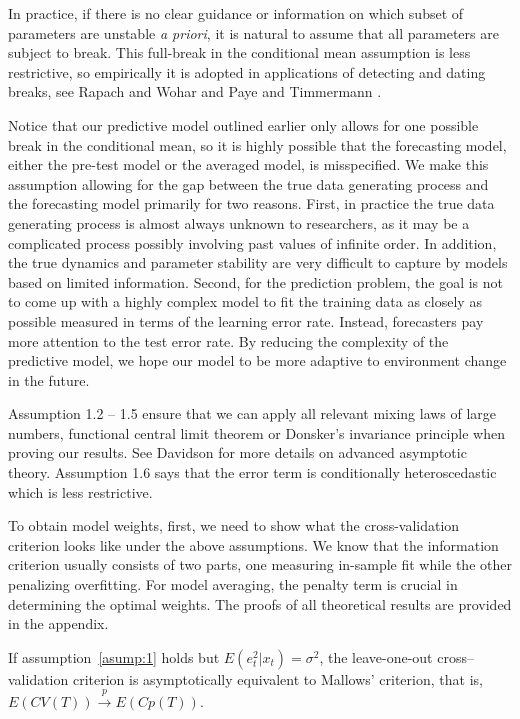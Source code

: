 In practice, if there is no clear guidance or information on which subset of parameters are unstable \emph{a priori}, it is natural to assume that all parameters are subject to break. This full-break in the conditional mean assumption is less restrictive, so empirically it is adopted in applications of detecting and dating breaks, see Rapach and Wohar \cite{rapach_wohar_JFE2006} and Paye and Timmermann \cite{paye_timmermann_JEF2006}.

Notice that our predictive model outlined earlier only allows for one possible break in the conditional mean, so it is highly possible that the forecasting model, either the pre-test model or the averaged model, is misspecified. We make this assumption allowing for the gap between the true data generating process and the forecasting model primarily for two reasons. First, in practice the true data generating process is almost always unknown to researchers, as it may be a complicated process possibly involving past values of infinite order. In addition, the true dynamics and parameter stability are very difficult to capture by models based on limited information. Second, for the prediction problem, the goal is not to come up with a highly complex model to fit the training data as closely as possible measured in terms of the learning error rate. Instead, forecasters pay more attention to the test error rate. By reducing the complexity of the predictive model, we hope our model to be more adaptive to environment change in the future.

Assumption 1.2 -- 1.5 ensure that we can apply all relevant mixing laws of large numbers, functional central limit theorem or Donsker's invariance principle when proving our results. See Davidson \cite{davidson_textbook} for more details on advanced asymptotic theory. Assumption 1.6 says that the error term is conditionally heteroscedastic which is less restrictive.

To obtain model weights, first, we need to show what the cross-validation criterion looks like under the above assumptions. We know that the information criterion usually consists of two parts, one measuring in-sample fit while the other penalizing overfitting. For model averaging, the penalty term is crucial in determining the optimal weights. The proofs of all theoretical results are provided in the appendix.

\begin{proposition} \label{thm:1}
If assumption~\ref{asump:1} holds but $E(e_t^{2}|x_t) = \sigma^{2}$, the leave-one-out cross--validation criterion is asymptotically equivalent to Mallows' criterion, that is, $E(CV(T)) \stackrel{p}{\rightarrow} E(Cp(T))$.
\end{proposition}

